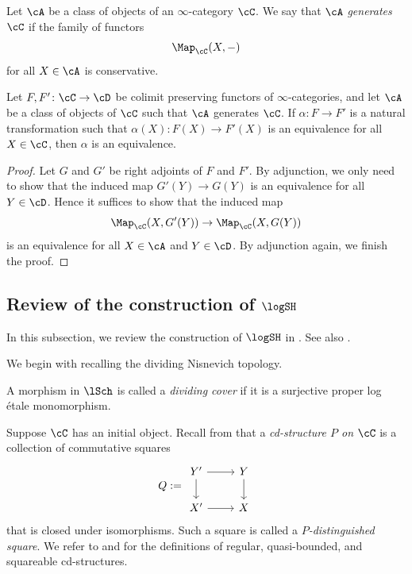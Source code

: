 \documentclass[10pt]{amsart}
\begin{document}
\begin{df}
\label{shv.6}
Let $\cA$ be a class of objects of an $\infty$-category $\cC$.
We say that $\cA$ \emph{generates $\cC$} if the family of functors
\[
\Map_{\cC}(X,-)
\]
for all $X\in \cA$ is conservative.
\end{df}

\begin{lem}
\label{shv.5}
Let $F,F'\colon \cC\to \cD$ be colimit preserving functors of $\infty$-categories, and let $\cA$ be a class of objects of $\cC$ such that $\cA$ generates $\cC$.
If $\alpha\colon F\to F'$ is a natural transformation such that $\alpha(X)\colon F(X)\to F'(X)$ is an equivalence for all $X\in \cC$, then $\alpha$ is an equivalence.
\end{lem}
\begin{proof}
Let $G$ and $G'$ be right adjoints of $F$ and $F'$.
By adjunction, we only need to show that the induced map $G'(Y)\to G(Y)$ is an equivalence for all $Y\in \cD$.
Hence it suffices to show that the induced map
\[
\Map_{\cC}(X,G'(Y))\to \Map_{\cC}(X,G(Y))
\]
is an equivalence for all $X\in \cA$ and $Y\in \cD$.
By adjunction again, we finish the proof.
\end{proof}


\subsection{Review of the construction of \texorpdfstring{$\logSH$}{logSH}}
\label{review}

In this subsection, we review the construction of $\logSH$ in \cite{logSH}.
See also \cite{logDMCras}.

We begin with recalling the dividing Nisnevich topology.

\begin{df}
A morphism  in $\lSch$ is called a \emph{dividing cover} if it is a surjective proper log \'etale monomorphism.
\end{df}

Suppose $\cC$ has an initial object.
Recall from \cite[Definition 2.1]{Voe10a} that a \emph{cd-structure $P$ on $\cC$} is a collection of commutative squares
\begin{equation}
\label{top.0.1}
Q
:=
\begin{tikzcd}
Y'\ar[d]\ar[r]&
Y\ar[d]
\\
X'\ar[r]&
X
\end{tikzcd}
\end{equation}
that is closed under isomorphisms.
Such a square is called a \emph{$P$-distinguished square}.
We refer to \cite[Definitions 2.10]{Voe10a} and \cite[Definitions 3.3.22, 3.4.2]{logDM} for the definitions of regular, quasi-bounded, and squareable cd-structures.
\end{document}
